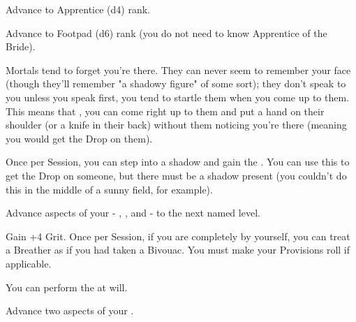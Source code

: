 \begin{multicols*}{2}


Advance  to Apprentice (d4) rank.


Advance  to Footpad (d6) rank (you do not need to know Apprentice of the Bride).



Mortals tend to forget you're there. They can never seem to remember your face (though they'll remember "a shadowy figure" of some sort); they don't speak to you unless you speak first, you tend to startle them when you come up to them. This means that , you can come right up to them and put a hand on their shoulder (or a knife in their back) without them noticing you're there (meaning you would get the Drop on them). 


Once per Session, you can step into a shadow and gain the .  You can use this to get the Drop on someone, but there must be a shadow present (you couldn't do this in the middle of a sunny field, for example).


Advance  aspects of your  - \DEATH, \INJURY, and \INSANITY - to the next named level. 

\newpage 


Gain +4 \MAX Grit. Once per Session, if you are completely by yourself, you can treat a Breather as if you had taken a Bivouac. You must make your Provisions roll if applicable. 


You can perform the  at will.


Advance two  aspects of your  \DCUP.



\end{multicols*}
